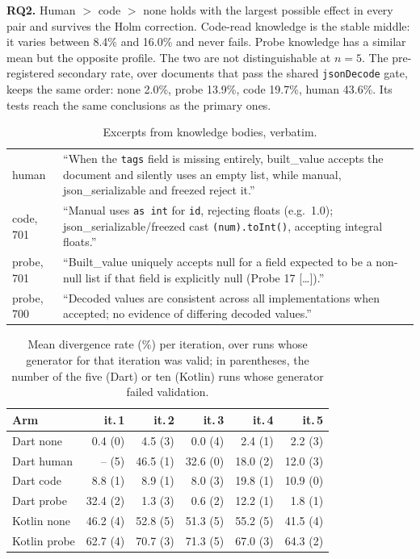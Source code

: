 \textbf{RQ2.} Human $>$ code $>$ none holds with the largest possible
effect in every pair and survives the Holm correction. Code-read knowledge is
the stable middle: it varies between 8.4\% and 16.0\% and never fails.
Probe knowledge has a similar mean but the opposite profile. The two are not
distinguishable at $n{=}5$. The pre-registered secondary rate, over
documents that pass the shared \texttt{jsonDecode} gate, keeps the same
order: none 2.0\%, probe 13.9\%, code 19.7\%, human 43.6\%. Its tests reach
the same conclusions as the primary ones.

\begin{table}[t]
\centering
\caption{Excerpts from knowledge bodies, verbatim.}
\label{tab:excerpts}
\footnotesize
\begin{tabularx}{\columnwidth}{@{}lX@{}}
\toprule
human & ``When the \texttt{tags} field is missing entirely, built\_value accepts the
document and silently uses an empty list, while manual, json\_serializable
and freezed reject it.'' \\
code, 701 & ``Manual uses \texttt{as int} for \texttt{id}, rejecting floats (e.g.\ 1.0);
json\_serializable/freezed cast \texttt{(num).toInt()}, accepting integral floats.'' \\
probe, 701 & ``Built\_value uniquely accepts null for a field expected to be a
non-null list if that field is explicitly null (Probe 17 [\ldots]).'' \\
probe, 700 & ``Decoded values are consistent across all implementations when
accepted; no evidence of differing decoded values.'' \\
\bottomrule
\end{tabularx}
\end{table}

\begin{table}[t]
\centering
\caption{Mean divergence rate (\%) per iteration, over runs whose generator
for that iteration was valid; in parentheses, the number of the five (Dart)
or ten (Kotlin) runs whose generator failed validation.}
\label{tab:iterations}
\footnotesize
\begin{tabular}{@{}lrrrrr@{}}
\toprule
Arm & it.\,1 & it.\,2 & it.\,3 & it.\,4 & it.\,5 \\
\midrule
Dart none   & 0.4 (0) & 4.5 (3) & 0.0 (4) & 2.4 (1) & 2.2 (3) \\
Dart human  & -- (5) & 46.5 (1) & 32.6 (0) & 18.0 (2) & 12.0 (3) \\
Dart code   & 8.8 (1) & 8.9 (1) & 8.0 (3) & 19.8 (1) & 10.9 (0) \\
Dart probe  & 32.4 (2) & 1.3 (3) & 0.6 (2) & 12.2 (1) & 1.8 (1) \\
Kotlin none & 46.2 (4) & 52.8 (5) & 51.3 (5) & 55.2 (5) & 41.5 (4) \\
Kotlin probe & 62.7 (4) & 70.7 (3) & 71.3 (5) & 67.0 (3) & 64.3 (2) \\
\bottomrule
\end{tabular}
\end{table}

